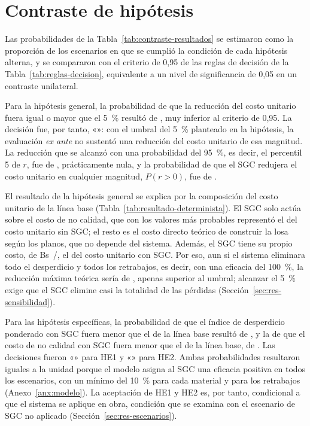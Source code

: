 \section{Contraste de hipótesis}
\label{sec:res-contraste}

Las probabilidades de la Tabla~\ref{tab:contraste-resultados} se estimaron como la proporción de los \MCiter{} escenarios en que se cumplió la condición de cada hipótesis alterna, y se compararon con el criterio de 0,95 de las reglas de decisión de la Tabla~\ref{tab:reglas-decision}, equivalente a un nivel de significancia de 0,05 en un contraste unilateral.

Para la hipótesis general, la probabilidad de que la reducción del costo unitario fuera igual o mayor que el 5~\% resultó de \PHG{}, muy inferior al criterio de 0,95. La decisión fue, por tanto, «\DecHG»: con el umbral del 5~\% planteado en la hipótesis, la evaluación \emph{ex ante} no sustentó una reducción del costo unitario de esa magnitud. La reducción que se alcanzó con una probabilidad del 95~\%, es decir, el percentil 5 de $r$, fue de \rPcinco{}, prácticamente nula, y la probabilidad de que el SGC redujera el costo unitario en cualquier magnitud, $P(r > 0)$, fue de \PRpos{}.

El resultado de la hipótesis general se explica por la composición del costo unitario de la línea base (Tabla~\ref{tab:resultado-determinista}). El SGC solo actúa sobre el costo de no calidad, que con los valores más probables representó el \CNCsinDetPct{} del costo unitario sin SGC; el resto es el costo directo teórico de construir la losa según los planos, que no depende del sistema. Además, el SGC tiene su propio costo, de Bs~\CCconDet/\mdos{}, el \CCconDetPct{} del costo unitario con SGC. Por eso, aun si el sistema eliminara todo el desperdicio y todos los retrabajos, es decir, con una eficacia del 100~\%, la reducción máxima teórica sería de \rMaxTeorico{}, apenas superior al umbral; alcanzar el 5~\% exige que el SGC elimine casi la totalidad de las pérdidas (Sección~\ref{sec:res-sensibilidad}).

Para las hipótesis específicas, la probabilidad de que el índice de desperdicio ponderado con SGC fuera menor que el de la línea base resultó de \PHEuno{}, y la de que el costo de no calidad con SGC fuera menor que el de la línea base, de \PHEdos{}. Las decisiones fueron «\DecHEuno» para HE1 y «\DecHEdos» para HE2. Ambas probabilidades resultaron iguales a la unidad porque el modelo asigna al SGC una eficacia positiva en todos los escenarios, con un mínimo del 10~\% para cada material y para los retrabajos (Anexo~\ref{anx:modelo}). La aceptación de HE1 y HE2 es, por tanto, condicional a que el sistema se aplique en obra, condición que se examina con el escenario de SGC no aplicado (Sección~\ref{sec:res-escenarios}).

